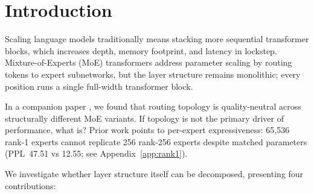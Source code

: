 \documentclass[10pt]{article}
\begin{document}
\section{Introduction}
\label{sec:intro}

Scaling language models traditionally means stacking more sequential transformer blocks, which increases depth, memory footprint, and latency in lockstep.
Mixture-of-Experts (MoE) transformers \citep{shazeer2017outrageously, lepikhin2021gshard, fedus2022switch, zoph2022stmoe} address parameter scaling by routing tokens to expert subnetworks, but the layer structure remains monolithic; every position runs a single full-width transformer block.

In a companion paper \citep{equifinality2026}, we found that routing topology is quality-neutral across structurally different MoE variants. If topology is not the primary driver of performance, what is? Prior work points to per-expert expressiveness: 65,536 rank-1 experts cannot replicate 256 rank-256 experts despite matched parameters (PPL~47.51 vs 12.55; see Appendix~\ref{app:rank1}).

We investigate whether layer structure itself can be decomposed, presenting four contributions:
\end{document}
